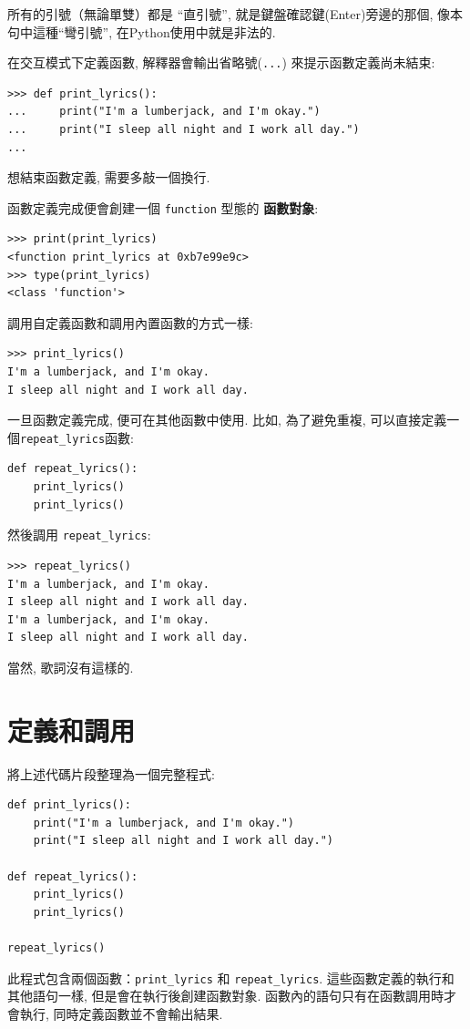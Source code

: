 \documentclass[10pt]{book}
\begin{document}
所有的引號（無論單雙）都是 ``直引號'', 就是鍵盤確認鍵(Enter)旁邊的那個, 
像本句中這種``彎引號'', 在Python使用中就是非法的. 

在交互模式下定義函數, 解釋器會輸出省略號({\tt ...}) 來提示函數定義尚未結束:

\begin{verbatim}
>>> def print_lyrics():
...     print("I'm a lumberjack, and I'm okay.")
...     print("I sleep all night and I work all day.")
...
\end{verbatim}
%
想結束函數定義, 需要多敲一個換行. 

函數定義完成便會創建一個 \verb"function" 型態的 {\bf 函數對象}:

\begin{verbatim}
>>> print(print_lyrics)
<function print_lyrics at 0xb7e99e9c>
>>> type(print_lyrics)
<class 'function'>
\end{verbatim}
%
調用自定義函數和調用內置函數的方式一樣:

\begin{verbatim}
>>> print_lyrics()
I'm a lumberjack, and I'm okay.
I sleep all night and I work all day.
\end{verbatim}
%
一旦函數定義完成, 便可在其他函數中使用. 比如, 為了避免重複, 
可以直接定義一個\verb"repeat_lyrics"函數:

\begin{verbatim}
def repeat_lyrics():
    print_lyrics()
    print_lyrics()
\end{verbatim}
%
然後調用 \verb"repeat_lyrics":

\begin{verbatim}
>>> repeat_lyrics()
I'm a lumberjack, and I'm okay.
I sleep all night and I work all day.
I'm a lumberjack, and I'm okay.
I sleep all night and I work all day.
\end{verbatim}
%
當然, 歌詞沒有這樣的. 

\section{定義和調用}

將上述代碼片段整理為一個完整程式:

\begin{verbatim}
def print_lyrics():
    print("I'm a lumberjack, and I'm okay.")
    print("I sleep all night and I work all day.")

def repeat_lyrics():
    print_lyrics()
    print_lyrics()

repeat_lyrics()
\end{verbatim}
%
此程式包含兩個函數：\verb"print_lyrics" 和 \verb"repeat_lyrics". 
這些函數定義的執行和其他語句一樣, 但是會在執行後創建函數對象. 
函數內的語句只有在函數調用時才會執行, 同時定義函數並不會輸出結果. 
\end{document}
